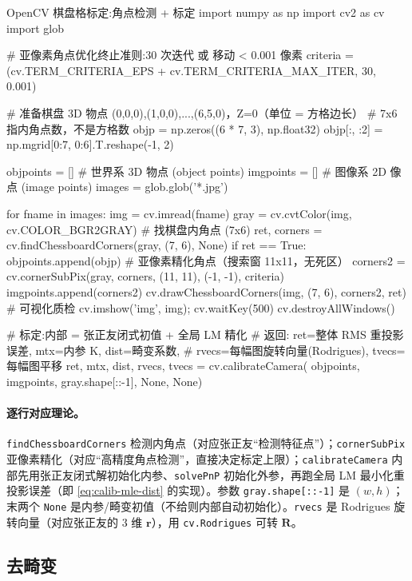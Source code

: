 \begin{codebox}[Python]{OpenCV 棋盘格标定:角点检测 + 标定}
import numpy as np
import cv2 as cv
import glob

# 亚像素角点优化终止准则:30 次迭代 或 移动 < 0.001 像素
criteria = (cv.TERM_CRITERIA_EPS + cv.TERM_CRITERIA_MAX_ITER, 30, 0.001)

# 准备棋盘 3D 物点 (0,0,0),(1,0,0),...,(6,5,0)，Z=0（单位 = 方格边长）
# 7x6 指内角点数，不是方格数
objp = np.zeros((6 * 7, 3), np.float32)
objp[:, :2] = np.mgrid[0:7, 0:6].T.reshape(-1, 2)

objpoints = []   # 世界系 3D 物点 (object points)
imgpoints = []   # 图像系 2D 像点 (image points)
images = glob.glob('*.jpg')

for fname in images:
    img = cv.imread(fname)
    gray = cv.cvtColor(img, cv.COLOR_BGR2GRAY)
    # 找棋盘内角点 (7x6)
    ret, corners = cv.findChessboardCorners(gray, (7, 6), None)
    if ret == True:
        objpoints.append(objp)
        # 亚像素精化角点（搜索窗 11x11，无死区）
        corners2 = cv.cornerSubPix(gray, corners, (11, 11), (-1, -1), criteria)
        imgpoints.append(corners2)
        cv.drawChessboardCorners(img, (7, 6), corners2, ret)  # 可视化质检
        cv.imshow('img', img); cv.waitKey(500)
cv.destroyAllWindows()

# 标定:内部 = 张正友闭式初值 + 全局 LM 精化
# 返回: ret=整体 RMS 重投影误差, mtx=内参 K, dist=畸变系数,
#       rvecs=每幅图旋转向量(Rodrigues), tvecs=每幅图平移
ret, mtx, dist, rvecs, tvecs = cv.calibrateCamera(
        objpoints, imgpoints, gray.shape[::-1], None, None)
\end{codebox}

\paragraph{逐行对应理论。}
\texttt{findChessboardCorners} 检测内角点（对应张正友“检测特征点”）；\texttt{cornerSubPix} 亚像素精化（对应“高精度角点检测”，直接决定标定上限）；\texttt{calibrateCamera} 内部先用张正友闭式解初始化内参、\texttt{solvePnP} 初始化外参，再跑全局 LM 最小化重投影误差（即 \cref{eq:calib-mle-dist} 的实现）\cite{opencv2024calib}。参数 \texttt{gray.\allowbreak shape[::-1]} 是 $(w,h)$；末两个 \texttt{None} 是内参/畸变初值（不给则内部自动初始化）。\texttt{rvecs} 是 Rodrigues 旋转向量（对应张正友的 $3$ 维 $\mathbf{r}$），用 \texttt{cv.\allowbreak Rodrigues} 可转 $\mathbf{R}$。

\subsection{去畸变}

